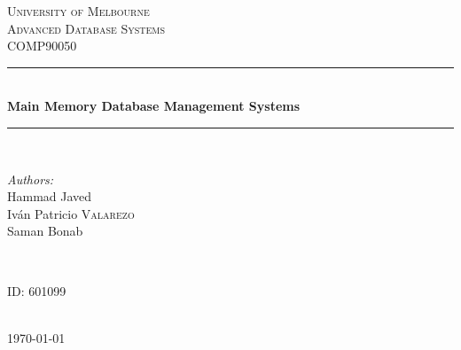 \documentclass[10pt]{article} %
\begin{document}

\begin{titlepage}

\newcommand{\HRule}{\rule{\linewidth}{0.5mm}} %

\center %

\textsc{\LARGE University of Melbourne}\\[1.5cm] %
\textsc{\Large Advanced Database Systems}\\[0.5cm] %
\textsc{\large COMP90050}\\[0.5cm] %

\HRule \\[0.4cm]
{ \huge \bfseries Main Memory Database Management Systems}\\[0.4cm] %
\HRule \\[1.5cm]

\begin{minipage}{0.4\textwidth}
\begin{flushleft} \large
\emph{Authors:}\\
Hammad Javed\\
Iván Patricio \textsc{Valarezo}\\ %
Saman Bonab\\
\end{flushleft}
\end{minipage}
~
\begin{minipage}{0.4\textwidth}
\begin{flushright} \large
ID: \textsc{601099} %
\end{flushright}
\end{minipage}\\[4cm]

{\large \today}\\[3cm] %


\vfill %

\end{titlepage}
\end{document}
